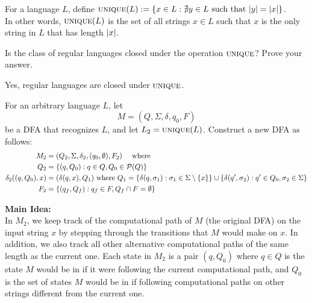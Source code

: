 \def \uniq { \textsc{unique} }
\begin{problem}
  For a language $L$, define
  $\uniq(L) := \set{x \in L : \nexists y \in L
  \text{ such that } \abs{y} = \abs{x}}$. \\
  In other words, $\uniq(L)$ is the set of all strings $x \in L$
  such that $x$ is the only string in $L$ that has length $\lvert x\rvert$.

  \step
  Is the class of regular languages closed under the operation $\uniq$?
  Prove your answer.
\end{problem}
\begin{Answer}
  Yes, regular languages are closed under $\uniq$.

  \step
  For an arbitrary language $L$, let
  \[ M = (Q, \Sigma, \delta, q_0, F) \]
  be a DFA that recognizes $L$, and let $L_2 = \uniq(L)$.
  Construct a new DFA as follows:
  \begin{align*}
    M_2 &= (Q_2, \Sigma, \delta_2, (q_0, \emptyset), F_2) \quad \text{ where } \\
    Q_2 &= \left\{(q, Q_0) : q \in Q, Q_0 \in \mathcal{P}(Q) \right\} \\
    \delta_2((q, Q_0), x) &= (\delta(q, x), Q_1) \text{ where $Q_1 = \left\{\delta(q, \sigma_1) : \sigma_1 \in \Sigma \setminus \left\{x\right\}\right\} \cup \left\{\delta(q', \sigma_2) : q' \in Q_0, \sigma_2 \in \Sigma\right\}$} \\
    F_2 &= \left\{(q_f, Q_f) : q_f \in F, Q_f \cap F = \emptyset\right\}
  \end{align*}

  \step
  \textbf{Main Idea:} \\
  In $M_2$, we keep track of the computational path of $M$ (the original DFA)
  on the input string $x$ by stepping through the transitions that $M$
  would make on $x$.
  In addition, we also track all other alternative computational paths of the same length
  as the current one.
  \step
  Each state in $M_2$ is a pair $(q, Q_0)$ where $q \in Q$ is the 
  state $M$ would be in if it were following the current computational path,
  and $Q_0$ is the set of states $M$ would be in if following computational
  paths on other strings different from the current one.
  

\end{Answer}
